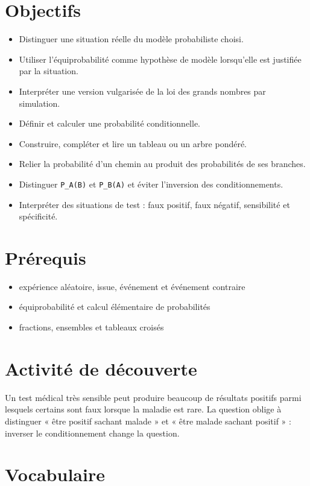 \section{Objectifs}

\begin{itemize}
\item Distinguer une situation réelle du modèle probabiliste choisi.
\item Utiliser l'équiprobabilité comme hypothèse de modèle lorsqu'elle est justifiée par la situation.
\item Interpréter une version vulgarisée de la loi des grands nombres par simulation.
\item Définir et calculer une probabilité conditionnelle.
\item Construire, compléter et lire un tableau ou un arbre pondéré.
\item Relier la probabilité d'un chemin au produit des probabilités de ses branches.
\item Distinguer \texttt{P_A(B)} et \texttt{P_B(A)} et éviter l'inversion des conditionnements.
\item Interpréter des situations de test : faux positif, faux négatif, sensibilité et spécificité.
\end{itemize}

\section{Prérequis}

\begin{itemize}
\item expérience aléatoire, issue, événement et événement contraire
\item équiprobabilité et calcul élémentaire de probabilités
\item fractions, ensembles et tableaux croisés
\end{itemize}

\section{Activité de découverte}

Un test médical très sensible peut produire beaucoup de résultats positifs parmi lesquels certains sont faux lorsque la maladie est rare. La question oblige à distinguer « être positif sachant malade » et « être malade sachant positif » : inverser le conditionnement change la question.

\section{Vocabulaire}

